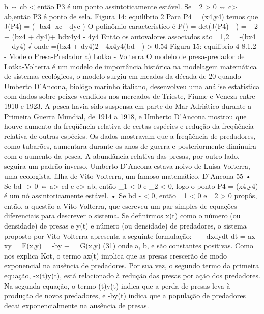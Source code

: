 {{{{{{{{{{{{{{{{{{{b ⇔ cb < \betaa então P3 é um ponto assintoticamente estável. 
Se \lambda_{2} > 0 ⇔ c\beta > ab,então P3 é ponto de sela. 
Figura 14: equilíbrio 2 
Para P4 = (x4,y4) temos que 
J(P4) = 
( -bx4 -\alpha xc -\betayc -dyc 
) 
O polinômio caracteristico é 
P(\lambda) = det(J(P4) - \lambdaI) = \lambda_{2} + (bx4 + dy4)\lambda + bdx4y4 - \alpha \betax4y4 Então os autovalores associados são 
\lambda_{1},2 = -(bx4 + dy4) \pm √ onde \Delta=(bx4 + dy4)2 - 4x4y4(bd - \alpha \beta) > 0.54 
Figura 15: equilibrio 4 
8.1.2 - Modelo Presa-Predador 
a) Lotka - Volterra 
O modelo de presa-predador de Lotka-Volterra é um modelo de importância histórica na modelagem matemática de sistemas ecológicos, o modelo surgiu em meados da década de 20 quando Umberto D ́Ancona, biológo marinho italiano, desenvolveu uma análise estatística com dados sobre peixes vendidos nos mercados de Trieste, Fiume e Veneza entre 1910 e 1923. A pesca havia sido suspensa em parte do Mar Adriático durante a Primeira Guerra Mundial, de 1914 a 1918, e Umberto D ́Ancona mostrou que houve aumento da freqüência relativa de certas espécies e redução da freqüência relativa de outras espécies. 
Os dados mostravam que a freqüência de predadores, como tubarões, aumentara durante os anos de guerra e posteriormente diminuira com o aumento da pesca. A abundância relativa das presas, por outro lado, seguira um padrão inverso. Umberto D ́Ancona estava noivo de Luisa Volterra, uma ecologista, filha de Vito Volterra, um famoso matemático. D ́Ancona 
55 
• Se bd -\alpha \beta > 0 ⇔ a\alpha  > cd e c\beta > ab, então \lambda_{1} < 0 e \lambda_{2} < 0, logo o ponto P4 = (x4,y4) é um nó assintoticamente estável. 
• Se bd - \alpha \beta < 0, então \lambda_{1} < 0 e \lambda_{2} > 0 
propôs, então, a questão a Vito Volterra, que escreveu um par simples de equações diferenciais para descrever o sistema. Se definirmos x(t) como o número (ou densidade) de presas e y(t) e número (ou densidade) de predadores, o sistema proposto por Vito Volterra apresenta a seguinte formulação: 
 
dxdydt dt = ax - \alpha xy = F(x,y) = -by + \betaxy = G(x,y) 
(31) 
onde a, b, \alpha  e \beta são constantes positivas. Como nos explica Kot, o termo ax(t) implica que as presas crescerão de modo exponencial na ausência de predadores. Por sua vez, o segundo termo da primeira equação, -\alpha x(t)y(t), está relacionado à redução das presas por ação dos predadores. Na segunda equação, o termo \betax(t)y(t) indica que a perda de presas leva à produção de novos predadores, e -by(t) indica que a população de predadores decai exponencialmente na ausência de presas. 
}}}}}}}}}}}}}}}}}}}
